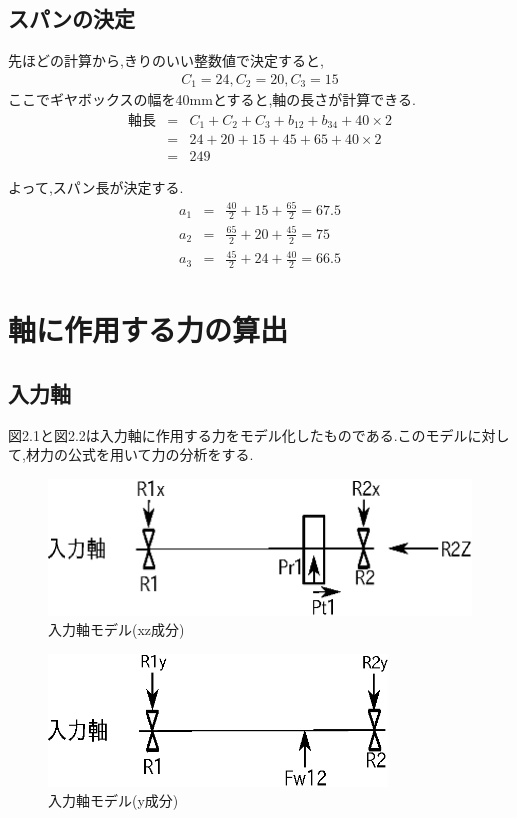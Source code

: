\documentclass[a4j,twoside,openright,11pt]{jreport}
\begin{document}
\subsection{スパンの決定}
先ほどの計算から,きりのいい整数値で決定すると,
\begin{eqnarray}
C_1=24,C_2=20,C_3=15\nonumber
\end{eqnarray}
ここでギヤボックスの幅を40mmとすると,軸の長さが計算できる.
\begin{eqnarray}
軸長&=&C_1+C_2+C_3+b_{12}+b_{34}+40 \times 2\\
    &=&24+20+15+45+65+40 \times 2\\
    &=&249
\end{eqnarray}

よって,スパン長が決定する.
\begin{eqnarray}
a_1&=&\frac{40}{2} + 15 + \frac{65}{2} = 67.5\\
a_2&=&\frac{65}{2} + 20 + \frac{45}{2} = 75\\
a_3&=&\frac{45}{2} + 24 + \frac{40}{2} = 66.5
\end{eqnarray}

\section{軸に作用する力の算出}
\subsection{入力軸}
図2.1と図2.2は入力軸に作用する力をモデル化したものである.このモデルに対して,材力の公式を用いて力の分析をする.
\begin{figure}[htbp]
\begin{center}
\includegraphics[width=12cm]{jiku1.eps}
\end{center}
\caption{入力軸モデル(xz成分)}
\end{figure}
\begin{figure}[htbp]
\begin{center}
\includegraphics[width=9cm]{jiku12.eps}
\end{center}
\caption{入力軸モデル(y成分)}
\end{figure}
\end{document}
